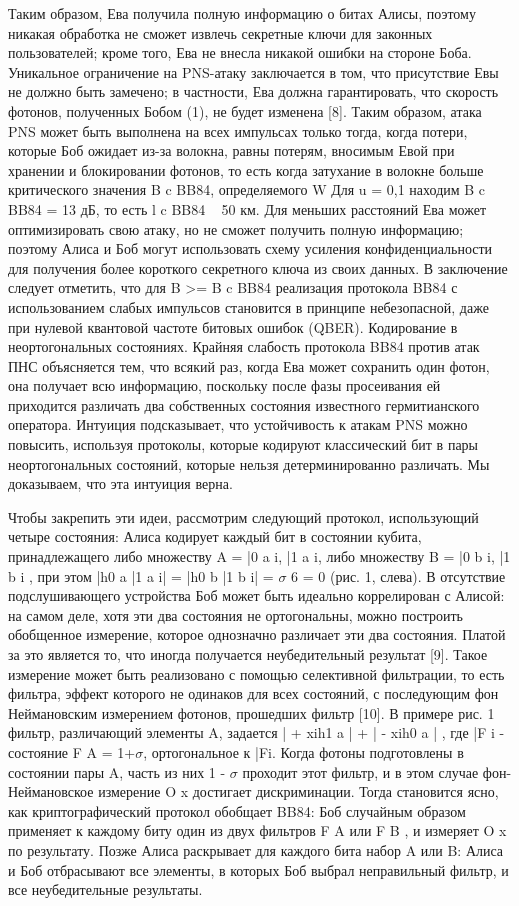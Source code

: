 Таким образом, Ева получила полную информацию о битах Алисы, поэтому никакая обработка не сможет извлечь секретные ключи для законных пользователей; кроме того, Ева не внесла никакой ошибки на стороне Боба.
Уникальное ограничение на PNS-атаку заключается в том, что присутствие Евы не должно быть замечено; в частности, Ева должна гарантировать, что скорость фотонов, полученных Бобом (1), не будет изменена [8]. Таким образом, атака PNS может быть выполнена на всех импульсах только тогда, когда потери, которые Боб ожидает из-за волокна, равны потерям, вносимым Евой при хранении и блокировании фотонов, то есть когда затухание в волокне больше критического значения B c BB84, определяемого W Для u = 0,1 находим B c BB84 = 13 дБ, то есть l c BB84 ~ 50 км. Для меньших расстояний Ева может оптимизировать свою атаку, но не сможет получить полную информацию; поэтому Алиса и Боб могут использовать схему усиления конфиденциальности для получения более короткого секретного ключа из своих данных. В заключение следует отметить, что для B >= B c BB84 реализация протокола BB84 с использованием слабых импульсов становится в принципе небезопасной, даже при нулевой квантовой частоте битовых ошибок (QBER).
Кодирование в неортогональных состояниях. Крайняя слабость протокола BB84 против атак ПНС объясняется тем, что всякий раз, когда Ева может сохранить один фотон, она получает всю информацию, поскольку после фазы просеивания ей приходится различать два собственных состояния известного гермитианского оператора. Интуиция подсказывает, что устойчивость к атакам PNS можно повысить, используя протоколы, которые кодируют классический бит в пары неортогональных состояний, которые нельзя детерминированно различать. Мы доказываем, что эта интуиция верна.

Чтобы закрепить эти идеи, рассмотрим следующий протокол, использующий четыре состояния: Алиса кодирует каждый бит в состоянии кубита, принадлежащего либо множеству A = |0 a i, |1 a i, либо множеству B = |0 b i, |1 b i , при этом |h0 a |1 a i| = |h0 b |1 b i| = $\sigma$ 6 = 0 (рис. 1, слева). В отсутствие подслушивающего устройства Боб может быть идеально коррелирован с Алисой: на самом деле, хотя эти два состояния не ортогональны, можно построить обобщенное измерение, которое однозначно различает эти два состояния. Платой за это является то, что иногда получается неубедительный результат [9]. Такое измерение может быть реализовано с помощью селективной фильтрации, то есть фильтра, эффект которого не одинаков для всех состояний, с последующим фон Неймановским измерением фотонов, прошедших фильтр [10]. В примере рис. 1 фильтр, различающий элементы A, задается | + xih1 a | + | - xih0 a | , где |F i - состояние F A = 1+$\sigma$, ортогональное к |Fi. Когда фотоны подготовлены в состоянии пары A, часть из них 1 - $\sigma$ проходит этот фильтр, и в этом случае фон-Неймановское измерение O x достигает дискриминации. Тогда становится ясно, как криптографический протокол обобщает BB84: Боб случайным образом применяет к каждому биту один из двух фильтров F A или F B , и измеряет O x по результату. Позже Алиса раскрывает для каждого бита набор A или B: Алиса и Боб отбрасывают все элементы, в которых Боб выбрал неправильный фильтр, и все неубедительные результаты.

